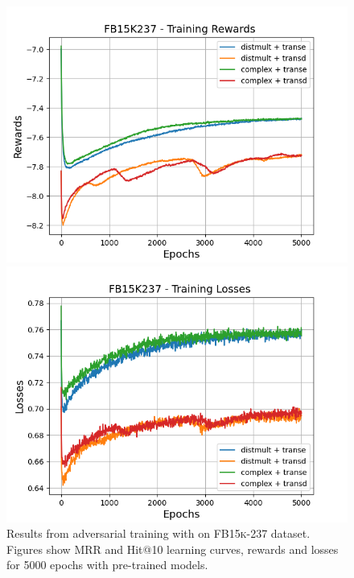 \begin{figure}[H]
    \begin{minipage}{.5\textwidth}
      \centering
      \includegraphics[width=\linewidth]{figures/results/gan_train/pretrained/random/fb15k237/gan_train_random_fb15k237_rewards.png}
    \end{minipage}%
     \begin{minipage}{.5\textwidth}
      \centering
      \includegraphics[width=\linewidth]{figures/results/gan_train/pretrained/random/fb15k237/gan_train_random_fb15k237_losses.png}
    \end{minipage}%
    \caption{Results from adversarial training with \origsampling on \textsc{FB15k-237} dataset.
    Figures show MRR and Hit@10 learning curves, rewards and losses for 5000 epochs with pre-trained models.}
    \label{fig:gan_train_pretrained_random_fb15k237}
\end{figure}
